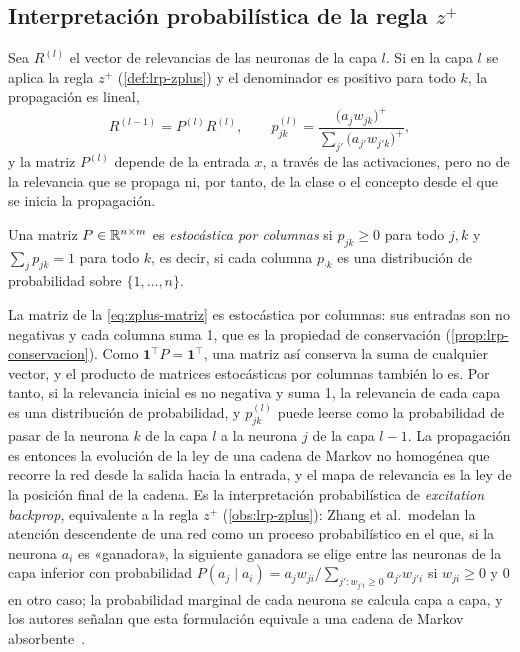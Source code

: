 \subsection{Interpretación probabilística de la regla $z^{+}$}\label{sec:lrp-markov}

Sea $R^{(l)}$ el vector de relevancias de las neuronas de la capa $l$. Si en la capa $l$ se aplica la regla $z^{+}$ (\cref{def:lrp-zplus}) y el denominador es positivo para todo $k$, la propagación es lineal,
\begin{equation}\label{eq:zplus-matriz}
  R^{(l-1)} = P^{(l)} R^{(l)},
  \qquad
  p^{(l)}_{jk} = \frac{\bigl(a_j w_{jk}\bigr)^{+}}{\sum_{j'} \bigl(a_{j'} w_{j'k}\bigr)^{+}} ,
\end{equation}
y la matriz $P^{(l)}$ depende de la entrada $x$, a través de las activaciones, pero no de la relevancia que se propaga ni, por tanto, de la clase o el concepto desde el que se inicia la propagación.

\begin{definicion}\label{def:estocastica-columnas}
Una matriz $P \in \mathbb{R}^{n \times m}$ es \emph{estocástica por columnas} si $p_{jk} \geq 0$ para todo $j, k$ y $\sum_{j} p_{jk} = 1$ para todo $k$, es decir, si cada columna $p_{\cdot k}$ es una distribución de probabilidad sobre $\{1, \dots, n\}$.
\end{definicion}

La matriz de la \cref{eq:zplus-matriz} es estocástica por columnas: sus entradas son no negativas y cada columna suma 1, que es la propiedad de conservación (\cref{prop:lrp-conservacion}). Como $\mathbf{1}^{\top} P = \mathbf{1}^{\top}$, una matriz así conserva la suma de cualquier vector, y el producto de matrices estocásticas por columnas también lo es. Por tanto, si la relevancia inicial es no negativa y suma 1, la relevancia de cada capa es una distribución de probabilidad, y $p^{(l)}_{jk}$ puede leerse como la probabilidad de pasar de la neurona $k$ de la capa $l$ a la neurona $j$ de la capa $l-1$. La propagación es entonces la evolución de la ley de una cadena de Markov no homogénea que recorre la red desde la salida hacia la entrada, y el mapa de relevancia es la ley de la posición final de la cadena. Es la interpretación probabilística de \emph{excitation backprop}, equivalente a la regla $z^{+}$ (\cref{obs:lrp-zplus}): Zhang et al.\ modelan la atención descendente de una red como un proceso probabilístico en el que, si la neurona $a_i$ es «ganadora», la siguiente ganadora se elige entre las neuronas de la capa inferior con probabilidad $P(a_j \mid a_i) = a_j w_{ji} / \sum_{j' : w_{j'i} \geq 0} a_{j'} w_{j'i}$ si $w_{ji} \geq 0$ y $0$ en otro caso; la probabilidad marginal de cada neurona se calcula capa a capa, y los autores señalan que esta formulación equivale a una cadena de Markov absorbente~\cite[ecs.~(1) y~(4)]{zhang2016excitation}.

